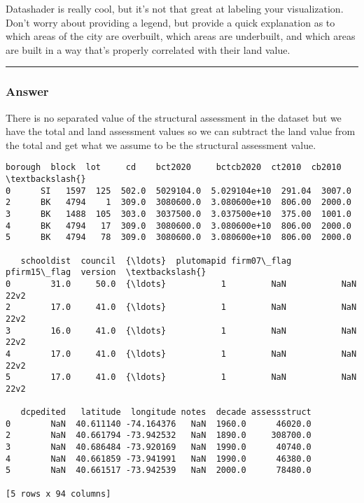 \documentclass[11pt]{article}
\begin{document}
Datashader is really cool, but it's not that great at labeling your
visualization. Don't worry about providing a legend, but provide a quick
explanation as to which areas of the city are overbuilt, which areas are
underbuilt, and which areas are built in a way that's properly
correlated with their land value.

\begin{center}\rule{0.5\linewidth}{0.5pt}\end{center}

\hypertarget{answer}{%
\subsubsection{Answer}\label{answer}}

There is no separated value of the structural assessment in the dataset
but we have the total and land assessment values so we can subtract the
land value from the total and get what we assume to be the structural
assessment value.

            \begin{tcolorbox}[breakable, size=fbox, boxrule=.5pt, pad at break*=1mm, opacityfill=0]
\begin{Verbatim}[commandchars=\\\{\}]
  borough  block  lot     cd    bct2020     bctcb2020  ct2010  cb2010  \textbackslash{}
0      SI   1597  125  502.0  5029104.0  5.029104e+10  291.04  3007.0
2      BK   4794    1  309.0  3080600.0  3.080600e+10  806.00  2000.0
3      BK   1488  105  303.0  3037500.0  3.037500e+10  375.00  1001.0
4      BK   4794   17  309.0  3080600.0  3.080600e+10  806.00  2000.0
5      BK   4794   78  309.0  3080600.0  3.080600e+10  806.00  2000.0

   schooldist  council  {\ldots}  plutomapid firm07\_flag  pfirm15\_flag  version  \textbackslash{}
0        31.0     50.0  {\ldots}           1         NaN           NaN     22v2
2        17.0     41.0  {\ldots}           1         NaN           NaN     22v2
3        16.0     41.0  {\ldots}           1         NaN           NaN     22v2
4        17.0     41.0  {\ldots}           1         NaN           NaN     22v2
5        17.0     41.0  {\ldots}           1         NaN           NaN     22v2

   dcpedited   latitude  longitude notes  decade assessstruct
0        NaN  40.611140 -74.164376   NaN  1960.0      46020.0
2        NaN  40.661794 -73.942532   NaN  1890.0     308700.0
3        NaN  40.686484 -73.920169   NaN  1990.0      40740.0
4        NaN  40.661859 -73.941991   NaN  1990.0      46380.0
5        NaN  40.661517 -73.942539   NaN  2000.0      78480.0

[5 rows x 94 columns]
\end{Verbatim}
\end{tcolorbox}
        
\end{document}
